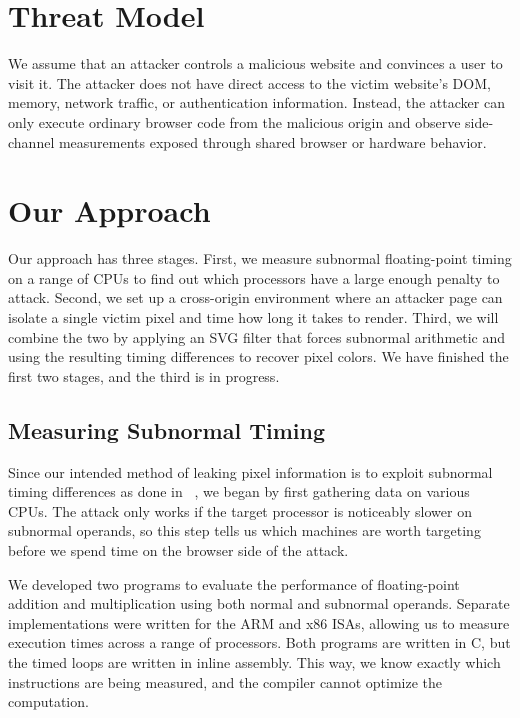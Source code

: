\section{Threat Model}
\label{sec:threat}

We assume that an attacker controls a malicious website and convinces a user to visit it. The attacker does not have direct access to the victim website's DOM, memory, network traffic, or authentication information. Instead, the attacker can only execute ordinary browser code from the malicious origin and observe side-channel measurements exposed through shared browser or hardware behavior.

\section{Our Approach}
\label{sec:approach}

Our approach has three stages. First, we measure subnormal floating-point timing on a range of CPUs to find out which processors have a large enough penalty to attack. Second, we set up a cross-origin environment where an attacker page can isolate a single victim pixel and time how long it takes to render. Third, we will combine the two by applying an SVG filter that forces subnormal arithmetic and using the resulting timing differences to recover pixel colors. We have finished the first two stages, and the third is in progress.

\subsection{Measuring Subnormal Timing}
Since our intended method of leaking pixel information is to exploit subnormal timing differences as done in ~\cite{andrysco2015subnormal}, we began by first gathering data on various CPUs. The attack only works if the target processor is noticeably slower on subnormal operands, so this step tells us which machines are worth targeting before we spend time on the browser side of the attack.

We developed two programs to evaluate the performance of floating-point addition and multiplication using both normal and subnormal operands. Separate implementations were written for the ARM and x86 ISAs, allowing us to measure execution times across a range of processors. Both programs are written in C, but the timed loops are written in inline assembly. This way, we know exactly which instructions are being measured, and the compiler cannot optimize the computation.

